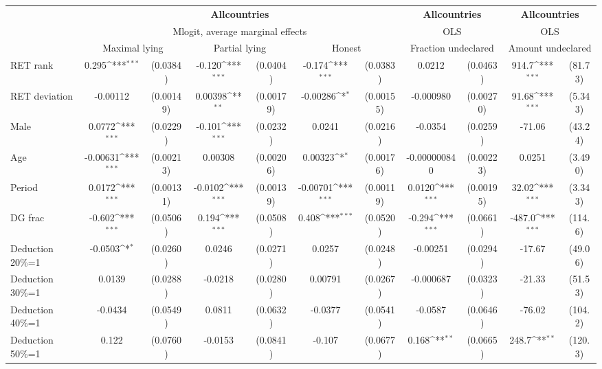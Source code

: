 \def\sym#1{\ifmmode^{#1}\else\(^{#1}\)\fi}
\begin{tabular}{l|cccccc|cc|cc}
\hline\hline
&\multicolumn{6}{c|}{\bf All\space{}countries}&\multicolumn{2}{c|}{\bf All\space{}countries}&\multicolumn{2}{c}{\bf All\space{}countries}\\ &\multicolumn{6}{c|}{Mlogit, average marginal effects }&\multicolumn{2}{c|}{OLS}&\multicolumn{2}{c}{OLS}\\
                &\multicolumn{2}{c}{Maximal lying}&\multicolumn{2}{c}{Partial lying}&\multicolumn{2}{c}{Honest}  &\multicolumn{2}{c}{Fraction undeclared}&\multicolumn{2}{c}{Amount undeclared}\\
\hline
RET rank        &    0.295\sym{***}& (0.0384)&   -0.120\sym{***}& (0.0404)&   -0.174\sym{***}& (0.0383)&   0.0212         & (0.0463)&    914.7\sym{***}&  (81.73)\\
RET deviation   & -0.00112         &(0.00149)&  0.00398\sym{**} &(0.00179)& -0.00286\sym{*}  &(0.00155)&-0.000980         &(0.00270)&    91.68\sym{***}&  (5.343)\\
Male            &   0.0772\sym{***}& (0.0229)&   -0.101\sym{***}& (0.0232)&   0.0241         & (0.0216)&  -0.0354         & (0.0259)&   -71.06         &  (43.24)\\
Age             & -0.00631\sym{***}&(0.00213)&  0.00308         &(0.00206)&  0.00323\sym{*}  &(0.00176)&-0.000000840         &(0.00223)&   0.0251         &  (3.490)\\
Period          &   0.0172\sym{***}&(0.00131)&  -0.0102\sym{***}&(0.00139)& -0.00701\sym{***}&(0.00119)&   0.0120\sym{***}&(0.00195)&    32.02\sym{***}&  (3.343)\\
DG frac         &   -0.602\sym{***}& (0.0506)&    0.194\sym{***}& (0.0508)&    0.408\sym{***}& (0.0520)&   -0.294\sym{***}& (0.0661)&   -487.0\sym{***}&  (114.6)\\
Deduction 20\%=1&  -0.0503\sym{*}  & (0.0260)&   0.0246         & (0.0271)&   0.0257         & (0.0248)& -0.00251         & (0.0294)&   -17.67         &  (49.06)\\
Deduction 30\%=1&   0.0139         & (0.0288)&  -0.0218         & (0.0280)&  0.00791         & (0.0267)&-0.000687         & (0.0323)&   -21.33         &  (51.53)\\
Deduction 40\%=1&  -0.0434         & (0.0549)&   0.0811         & (0.0632)&  -0.0377         & (0.0541)&  -0.0587         & (0.0646)&   -76.02         &  (104.2)\\
Deduction 50\%=1&    0.122         & (0.0760)&  -0.0153         & (0.0841)&   -0.107         & (0.0677)&    0.168\sym{**} & (0.0665)&    248.7\sym{**} &  (120.3)\\

\end{tabular}
